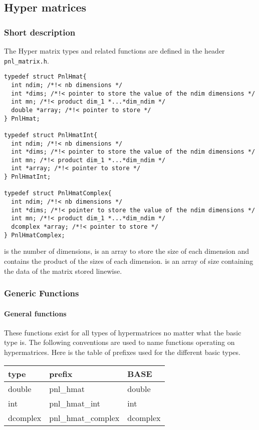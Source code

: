 \subsection{Hyper matrices}
\subsubsection{Short description}

The Hyper matrix types and related functions are defined in the header \verb!pnl_matrix.h!.

\begin{verbatim}
typedef struct PnlHmat{
  int ndim; /*!< nb dimensions */ 
  int *dims; /*!< pointer to store the value of the ndim dimensions */ 
  int mn; /*!< product dim_1 *...*dim_ndim */
  double *array; /*!< pointer to store */
} PnlHmat;

typedef struct PnlHmatInt{
  int ndim; /*!< nb dimensions */ 
  int *dims; /*!< pointer to store the value of the ndim dimensions */ 
  int mn; /*!< product dim_1 *...*dim_ndim */
  int *array; /*!< pointer to store */
} PnlHmatInt;

typedef struct PnlHmatComplex{
  int ndim; /*!< nb dimensions */ 
  int *dims; /*!< pointer to store the value of the ndim dimensions */ 
  int mn; /*!< product dim_1 *...*dim_ndim */
  dcomplex *array; /*!< pointer to store */
} PnlHmatComplex;
\end{verbatim}
 is the number of dimensions,  is an array to store the
size of each dimension and  contains the product of the sizes of each
dimension.  is an array of size  containing the data of the
matrix stored linewise.


\subsubsection{Generic Functions}
\paragraph{General functions}
These functions exist for all types of hypermatrices no matter what the basic type
is. The following conventions are used to name functions operating on hypermatrices.
Here is the table of prefixes used for the different basic types.

\begin{center}
  \begin{tabular}[t]{lll}
    type & prefix & BASE\\
    \hline
    double & pnl_hmat & double \\
    \hline
    int & pnl_hmat_int & int \\
    \hline
    dcomplex & pnl_hmat_complex & dcomplex
  \end{tabular}
\end{center}

